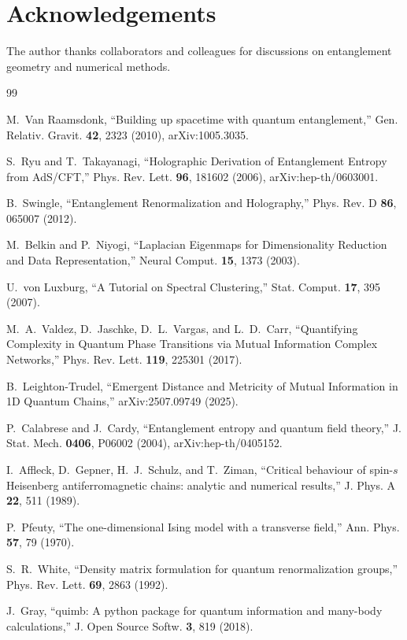 \documentclass[aps,prx,reprint,amsmath,amssymb,superscriptaddress]{revtex4-2}
\begin{document}
\section*{Acknowledgements}
The author thanks collaborators and colleagues for discussions on entanglement geometry and
numerical methods.

\begin{thebibliography}{99}

M.~Van Raamsdonk, ``Building up spacetime with quantum entanglement,''
Gen. Relativ. Gravit. \textbf{42}, 2323 (2010), arXiv:1005.3035.

S.~Ryu and T.~Takayanagi, ``Holographic Derivation of Entanglement Entropy from AdS/CFT,''
Phys. Rev. Lett. \textbf{96}, 181602 (2006), arXiv:hep-th/0603001.

B.~Swingle, ``Entanglement Renormalization and Holography,''
Phys. Rev. D \textbf{86}, 065007 (2012).

M.~Belkin and P.~Niyogi, ``Laplacian Eigenmaps for Dimensionality Reduction and Data Representation,''
Neural Comput. \textbf{15}, 1373 (2003).

U.~von Luxburg, ``A Tutorial on Spectral Clustering,''
Stat. Comput. \textbf{17}, 395 (2007).

M.~A.~Valdez, D.~Jaschke, D.~L.~Vargas, and L.~D.~Carr, ``Quantifying Complexity in Quantum Phase
Transitions via Mutual Information Complex Networks,''
Phys. Rev. Lett. \textbf{119}, 225301 (2017).

B.~Leighton-Trudel, ``Emergent Distance and Metricity of Mutual Information in 1D Quantum Chains,''
arXiv:2507.09749 (2025).

P.~Calabrese and J.~Cardy, ``Entanglement entropy and quantum field theory,''
J. Stat. Mech. \textbf{0406}, P06002 (2004), arXiv:hep-th/0405152.

I.~Affleck, D.~Gepner, H.~J.~Schulz, and T.~Ziman, ``Critical behaviour of spin-$s$ Heisenberg
antiferromagnetic chains: analytic and numerical results,''
J. Phys. A \textbf{22}, 511 (1989).

P.~Pfeuty, ``The one-dimensional Ising model with a transverse field,''
Ann. Phys. \textbf{57}, 79 (1970).

S.~R.~White, ``Density matrix formulation for quantum renormalization groups,''
Phys. Rev. Lett. \textbf{69}, 2863 (1992).

J.~Gray, ``quimb: A python package for quantum information and many-body calculations,''
J. Open Source Softw. \textbf{3}, 819 (2018).

\end{thebibliography}
\end{document}
